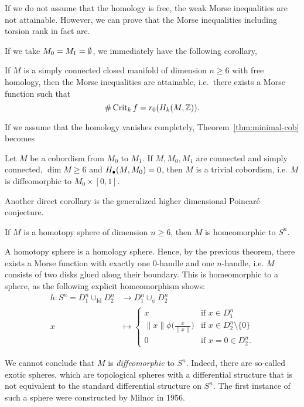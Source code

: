 \begin{remark}
    If we do not assume that the homology is free, the weak Morse inequalities are not attainable.
    However, we can prove that the Morse inequalities including torsion rank in fact are.
\end{remark}

If we take $ M_0 = M_1 = \emptyset$, we immediately have the following corollary,
\begin{corollary}
    If $M$ is a simply connected closed manifold of dimension  $n \ge 6$ with free homology, then the Morse inequalities are attainable, i.e.\ there exists a Morse function such that
    \[
        \# \operatorname{Crit}_kf = r_0 (H_k(M, \mathbb{Z}))
    .\] 
\end{corollary}

If we assume that the homology vanishes completely,
Theorem~\ref{thm:minimal-cob} becomes
\begin{corollary}
    Let $M$ be a cobordism from  $M_0$ to $M_1$.
    If $M, M_0, M_1$ are connected and simply connected, $\dim M \ge  6$ and $H_{\bullet}(M, M_0) = 0$, then $M$ is a trivial cobordism, i.e.  $M$ is diffeomorphic to $M_0 \times [0,1]$.
\end{corollary}

Another direct corollary is the generalized higher dimensional Poincaré conjecture.

\begin{corollary}
    If $M$ is a homotopy sphere of dimension  $n \ge  6$, then $M$ is homeomorphic to  $S^{n}$.
\end{corollary}
\begin{myproof}
    A homotopy sphere is a homology sphere.
    Hence, by the previous theorem, there exists a Morse function with exactly one $0$-handle and one $n$-handle, i.e. $M$ consists of two disks glued along their boundary. This is homeomorphic to a sphere, as the following explicit homeomorphism shows:
    \begin{align*}
        h: S^{n} = D_1^{n} \cup_\text{Id}  D_2^{n} &\longrightarrow D_1^{n} \cup_\phi D_2^{n} \\
         x &\longmapsto 
         \begin{cases}
             x & \text{if $x \in D_1^{n}$}\\
             \|x\| \phi\Big(\frac{x}{\|x\|}\Big) & \text{if $x \in D_2 ^{n} \setminus \{0\} $}\\
             0 & \text{if $x = 0 \in D_2^{n}$.}
         \end{cases}
    \end{align*}
\end{myproof}
\begin{remark}
    We cannot conclude that $M$ is \emph{diffeomorphic} to $S^{n}$.
    Indeed, there are so-called exotic spheres, which are topological spheres with a differential structure that is not equivalent to the standard differential structure on $S^{n}$.
    The first instance of such a sphere were constructed by Milnor in 1956.
\end{remark}


